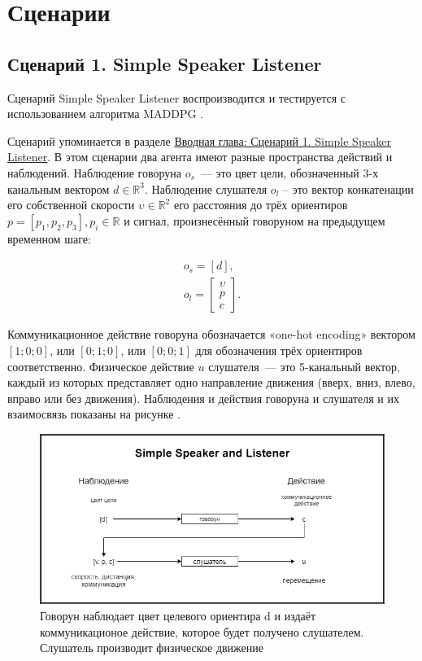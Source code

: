 \section{Сценарии}

\subsection{Сценарий 1. Simple Speaker Listener}  \label{exp-ssl}

Сценарий Simple Speaker Listener воспроизводится и тестируется с использованием алгоритма MADDPG \cite{lowe2017multiagent}.

Сценарий упоминается в разделе \hyperref[intro:ssl]{Вводная глава: Сценарий 1. Simple Speaker Listener}. В этом сценарии два агента имеют разные пространства действий и наблюдений. Наблюдение говоруна $o_s$~--- это цвет цели, обозначенный 3-х канальным вектором $d \in \mathbb{R}^3$. Наблюдение слушателя $o_l$ – это вектор конкатенации его собственной скорости $\upsilon \in \mathbb{R}^2$ его расстояния до трёх ориентиров $p = [p_1, p_2, p_3], p_i \in \mathbb{R}$ и сигнал, произнесённый говоруном на предыдущем временном шаге:

\begin{equation}
    \begin{multlined}
        o_s = [d], \\
        o_l = \begin{bmatrix}
                  \upsilon \\ p \\ c
        \end{bmatrix}.
    \end{multlined}
\end{equation}

Коммуникационное действие говоруна обозначается «one-hot encoding» вектором ${[1; 0; 0]}$, или ${[0; 1; 0]}$, или ${[0; 0; 1]}$ для обозначения трёх ориентиров соответственно.
Физическое действие $u$ слушателя~--- это 5-канальный вектор, каждый из которых представляет одно направление движения (вверх, вниз, влево, вправо или без движения). Наблюдения и действия говоруна и слушателя и их взаимосвязь показаны на рисунке .

\begin{figure}[ht!]
    \center
    \includegraphics [scale=0.60] {my_folder/images/ch4/simple_speaker_listener.png}
    \caption{Говорун наблюдает цвет целевого ориентира d и издаёт коммуникационое действие, которое будет получено слушателем. Слушатель производит физическое движение}
    \label{fig:ch4-ssl}
\end{figure}

